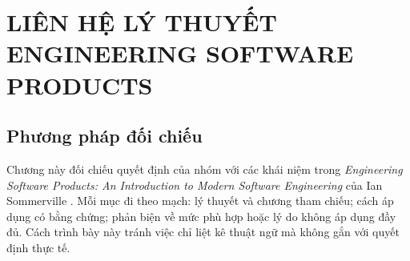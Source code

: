 \chapter{LIÊN HỆ LÝ THUYẾT ENGINEERING SOFTWARE PRODUCTS}

\section{Phương pháp đối chiếu}

Chương này đối chiếu quyết định của nhóm với các khái niệm trong \textit{Engineering Software Products: An Introduction to Modern Software Engineering} của Ian Sommerville \cite{sommerville-esp}. Mỗi mục đi theo mạch: lý thuyết và chương tham chiếu; cách áp dụng có bằng chứng; phản biện về mức phù hợp hoặc lý do không áp dụng đầy đủ. Cách trình bày này tránh việc chỉ liệt kê thuật ngữ mà không gắn với quyết định thực tế.

